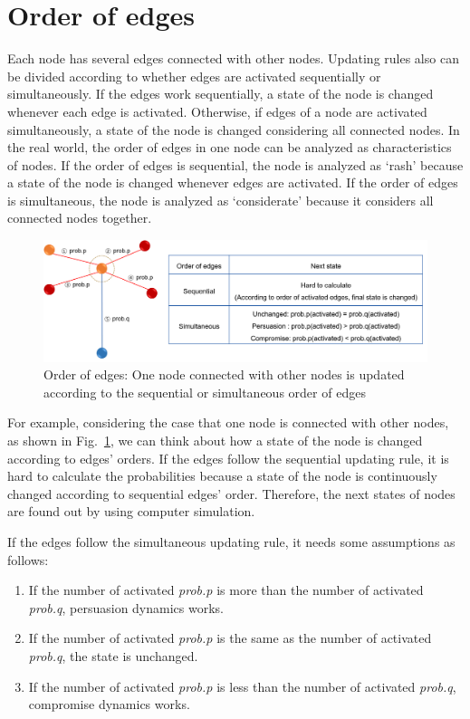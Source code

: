 \section{Order of edges}
Each node has several edges connected with other nodes. Updating rules also can be divided according to whether edges are activated sequentially or simultaneously. If the edges work sequentially, a state of the node is changed whenever each edge is activated. Otherwise, if edges of a node are activated simultaneously, a state of the node is changed considering all connected nodes. In the real world, the order of edges in one node can be analyzed as characteristics of nodes. If the order of edges is sequential, the node is analyzed as `rash' because a state of the node is changed whenever edges are activated. If the order of edges is simultaneous, the node is analyzed as `considerate' because it considers all connected nodes together. 

\begin{figure}[!htb]
	\centering
	\includegraphics[width=\hsize]{figure/chap4_edgeorder_explanation.png}
	\caption{Order of edges: One node connected with other nodes is updated according to the sequential or simultaneous order of edges}
	\label{edgeorder_explanation}
\end{figure}  

For example, considering the case that one node is connected with other nodes, as shown in Fig.~\ref{edgeorder_explanation}, we can think about how a state of the node is changed according to edges' orders. If the edges follow the sequential updating rule, it is hard to calculate the probabilities because a state of the node is continuously changed according to sequential edges' order. Therefore, the next states of nodes are found out by using computer simulation.

If the edges follow the simultaneous updating rule, it needs some assumptions as follows: 
\begin{enumerate}
	\item If the number of activated \textit{prob.p} is more than the number of activated \textit{prob.q}, persuasion dynamics works. 
	\item If the number of activated \textit{prob.p} is the same as the number of activated \textit{prob.q}, the state is unchanged.
	\item If the number of activated \textit{prob.p} is less than the number of activated \textit{prob.q}, compromise dynamics works.
\end{enumerate}

